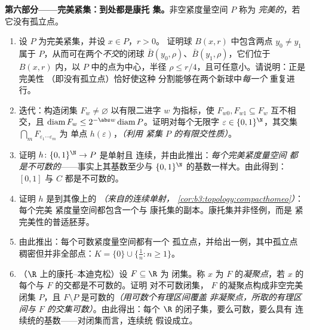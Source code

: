 \begin{problem}
\medskip
\noindent\textbf{第六部分——完美紧集：到处都是康托
集。}非空紧度量空间 $P$ 称为
\emph{完美的}，若它没有孤立点。
\begin{enumerate}[resume]
  \item 设 $P$ 为完美紧集，并设 $x \in P$，$r > 0$。
        证明球 $B(x, r)$ 中包含两点 $y_0
        \neq y_1$ 属于 $P$，从而可在两个\emph{不交}的闭球
        $\bar B(y_0, \rho)$、$\bar B(y_1, \rho)$，它们位于
        $B(x, r)$ 内，以 $P$ 中的点为中心，半径 $\rho
        \leq r/4$，且可任意小。请说明：正是完美性
        （即没有孤立点）恰好使这种
        分割能够在两个新球中\emph{每一个}
        重复进行。
  \item 迭代：构造闭集 $F_w \neq \varnothing$
        以有限二进字 $w$ 为指标，使 $F_{w0},
        F_{w1} \subseteq F_w$ 互不相交，且
        $\operatorname{diam}F_w \leq 2^{-\abs w}
        \operatorname{diam}P$。证明对每个无限字
        $\varepsilon \in \{0,1\}^\N$，其交集
        $\bigcap_mF_{\varepsilon_1\cdots\varepsilon_m}$ 为
        单点 $h(\varepsilon)$，\emph{（利用
        紧集 $P$ 的有限交性质）}。
  \item 证明 $h\colon\{0,1\}^\N \to P$ 是单射且
        连续，并由此推出：\emph{每个完美紧度量空间
        都是不可数的}——事实上其基数至少与
        $\{0,1\}^\N$ 的基数一样大。由此得到：$[0,1]$ 与 $C$
        都是不可数的。
  \item 证明 $h$ 是到其像上的
        \emph{（来自的连续单射，
        \cref{cor:b3:topology:compacthomeo}）}：每个完美
        紧度量空间都包含一个与
        康托集的副本。康托集并非怪例，而是
        紧完美性的普适胚芽。
  \item 由此推出：每个可数紧度量空间都有一个
        孤立点，并给出一例，其中孤立点
        稠密但并非全部点：$K = \{0\} \cup
        \{\frac1n : n \geq 1\}$。
  \item （$\R$ 上的康托--本迪克松）设 $F \subseteq \R$ 为
        闭集。称 $x$ 为 $F$ 的\emph{凝聚点}，若
        $x$ 的每个与 $F$ 的交都是不可数的。证明
        对不可数闭集，
        $F$ 的凝聚点构成非空完美闭集 $P$，且 $F
        \setminus P$ 是可数的\emph{（用可数个有理区间覆盖
        非凝聚点，所取的有理区间与
        $F$ 的交集可数）}。由此得出：每个
        $\R$ 的闭子集，要么可数，要么具有
        连续统的基数——对闭集而言，连续统
        假设成立。
\end{enumerate}


\end{problem}
